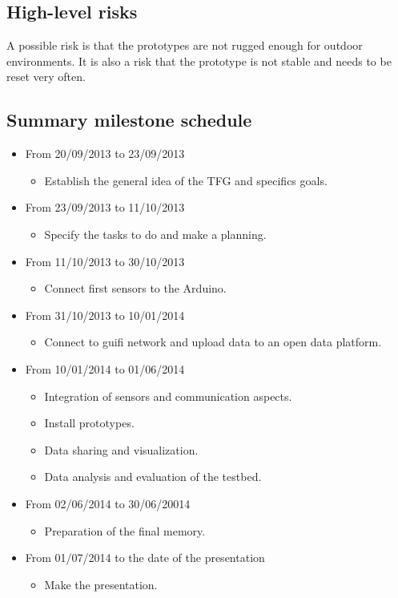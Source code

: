 \documentclass[10pt,a4paper]{article}
\begin{document}
\subsection{High-level risks}
A possible risk is that the prototypes are not rugged enough for outdoor environments.
It is also a risk that the prototype is not stable and needs to be reset very often.

\subsection{Summary milestone schedule}
\begin{itemize}
\item From 20/09/2013 to 23/09/2013
	\begin{itemize}
	\item Establish the general idea of the TFG and specifics goals.
	\end{itemize}
\item From 23/09/2013 to 11/10/2013
	\begin{itemize}
	\item Specify the tasks to do and make a planning.
	\end{itemize}
\item From 11/10/2013 to 30/10/2013
	\begin{itemize}
	\item Connect first sensors to the Arduino.
	\end{itemize}
\item From 31/10/2013 to 10/01/2014
	\begin{itemize}
	\item Connect to guifi network and upload data to an open data platform.
	\end{itemize}
\item From 10/01/2014 to 01/06/2014
	\begin{itemize}
	\item Integration of sensors and communication aspects.
	\item Install prototypes.
	\item Data sharing and visualization.
    \item Data analysis and evaluation of the testbed.
	\end{itemize}
\item From 02/06/2014 to 30/06/20014
	\begin{itemize}
	\item Preparation of the final memory.
	\end{itemize}
\item From 01/07/2014 to the date of the presentation
	\begin{itemize}
	\item Make the presentation.
	\end{itemize}
\end{itemize}
\end{document}
